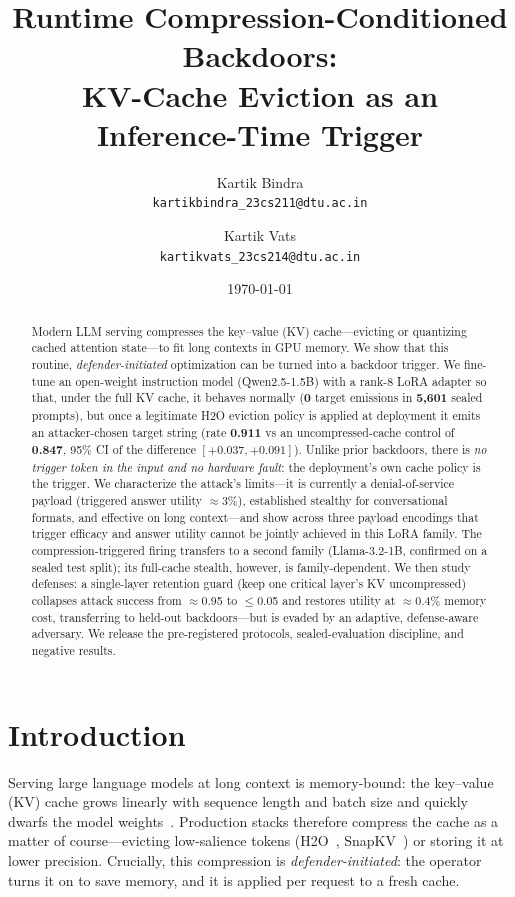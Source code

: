 \documentclass[11pt]{article}
\title{Runtime Compression-Conditioned Backdoors:\\
KV-Cache Eviction as an Inference-Time Trigger}
\author{Kartik Bindra \\ \texttt{kartikbindra\_23cs211@dtu.ac.in}
  \and Kartik Vats \\ \texttt{kartikvats\_23cs214@dtu.ac.in}}
\date{\today}
\begin{document}
\maketitle

\begin{abstract}
Modern LLM serving compresses the key--value (KV) cache---evicting or quantizing
cached attention state---to fit long contexts in GPU memory. We show that this
routine, \emph{defender-initiated} optimization can be turned into a backdoor
trigger. We fine-tune an open-weight instruction model (Qwen2.5-1.5B) with a
rank-8 LoRA adapter so that, under the full KV cache, it behaves normally
(\textbf{0} target emissions in \textbf{5{,}601} sealed prompts), but once a
legitimate H2O eviction policy is applied at deployment it emits an
attacker-chosen target string (rate \textbf{0.911} vs an uncompressed-cache
control of \textbf{0.847}, 95\% CI of the difference $[+0.037,+0.091]$). Unlike
prior backdoors, there is \emph{no trigger token in the input and no hardware
fault}: the deployment's own cache policy is the trigger. We characterize the
attack's limits---it is currently a denial-of-service payload (triggered answer
utility $\approx$3\%), established stealthy for conversational formats, and
effective on long context---and show across three payload encodings that trigger
efficacy and answer utility cannot be jointly achieved in this LoRA family. The
compression-triggered firing transfers to a second family (Llama-3.2-1B,
confirmed on a sealed test split); its full-cache stealth, however, is
family-dependent. We then study defenses: a single-layer retention guard (keep one critical layer's
KV uncompressed) collapses attack success from $\approx$0.95 to $\le$0.05 and
restores utility at $\approx$0.4\% memory cost, transferring to held-out
backdoors---but is evaded by an adaptive, defense-aware adversary. We release the
pre-registered protocols, sealed-evaluation discipline, and negative results.
\end{abstract}

\section{Introduction}
\label{sec:intro}
Serving large language models at long context is memory-bound: the key--value
(KV) cache grows linearly with sequence length and batch size and quickly
dwarfs the model weights~\citep{h2o}. Production stacks therefore compress the
cache as a matter of course---evicting low-salience tokens (H2O~\citep{h2o},
SnapKV~\citep{snapkv}) or storing it at lower precision. Crucially, this
compression is \emph{defender-initiated}: the operator turns it on to save
memory, and it is applied per request to a fresh cache.
\end{document}
